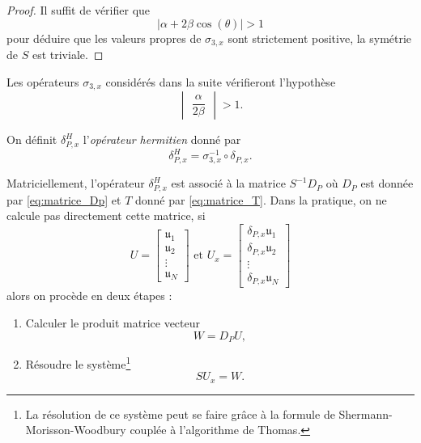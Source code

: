 \begin{proof}
Il suffit de vérifier que 
\begin{equation}
| \alpha + 2 \beta \cos \left( \theta \right) | > 1
\end{equation}
pour déduire que les valeurs propres de $\sigma_{3,x}$ sont strictement positive, la symétrie de $S$ est triviale.
\end{proof}

Les opérateurs $\sigma_{3,x}$ considérés dans la suite vérifieront l'hypothèse 
\begin{equation}
\begin{vmatrix}
\dfrac{\alpha}{2 \beta}
\end{vmatrix} > 1.
\end{equation}

\begin{definition}
On définit $\delta_{P,x}^H$ l'\textit{opérateur hermitien} donné par 
\begin{equation}
\delta_{P,x}^H = \sigma_{3,x}^{-1} \circ \delta_{P,x}.
\end{equation}
\end{definition}

Matriciellement, l'opérateur $\delta_{P,x}^H$ est associé à la matrice $S^{-1} D_P$ où $D_P$ est donnée par \eqref{eq:matrice_Dp} et $T$ donné par \eqref{eq:matrice_T}. Dans la pratique, on ne calcule pas directement cette matrice, si
\begin{equation}
U = \begin{bmatrix}
\mathfrak{u}_1 \\
\mathfrak{u}_2 \\
\vdots \\
\mathfrak{u}_N 
\end{bmatrix} \text{ et } 
U_x = \begin{bmatrix}
\delta_{P,x}\mathfrak{u}_1 \\
\delta_{P,x}\mathfrak{u}_2 \\
\vdots \\
\delta_{P,x}\mathfrak{u}_N 
\end{bmatrix}
\end{equation}
alors on procède en deux étapes :
\begin{enumerate}
\item Calculer le produit matrice vecteur 
\begin{equation}
W = D_P U,
\end{equation}
\item Résoudre le système\footnote{La résolution de ce système peut se faire grâce à la formule de Shermann-Morisson-Woodbury couplée à l'algorithme de Thomas.} 
\begin{equation}
S U_x = W.
\end{equation}
\end{enumerate}

